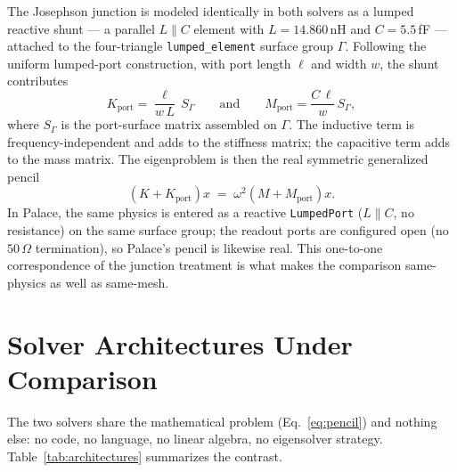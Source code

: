\documentclass{anvil-paper}
\begin{document}
The Josephson junction is modeled identically in both solvers as a lumped
reactive shunt --- a parallel $L \parallel C$ element with
$L = 14.860$\,nH and $C = 5.5$\,fF --- attached to the four-triangle
\texttt{lumped\_element} surface group $\Gamma$. Following the uniform
lumped-port construction, with port length $\ell$ and width $w$, the shunt
contributes
\begin{equation}
  K_{\mathrm{port}} = \frac{\ell}{w\,L}\, S_\Gamma
  \qquad\text{and}\qquad
  M_{\mathrm{port}} = \frac{C\,\ell}{w}\, S_\Gamma ,
  \label{eq:port}
\end{equation}
where $S_\Gamma$ is the port-surface matrix assembled on $\Gamma$. The
inductive term is frequency-independent and adds to the stiffness matrix;
the capacitive term adds to the mass matrix. The eigenproblem is then the
real symmetric generalized pencil
\begin{equation}
  \left(K + K_{\mathrm{port}}\right) x
  \;=\; \omega^2 \left(M + M_{\mathrm{port}}\right) x .
  \label{eq:pencil}
\end{equation}
In Palace, the same physics is entered as a reactive \texttt{LumpedPort}
($L \parallel C$, no resistance) on the same surface group; the readout
ports are configured open (no $50\,\Omega$ termination), so Palace's pencil
is likewise real. This one-to-one correspondence of the junction treatment
is what makes the comparison same-physics as well as same-mesh.

\section{Solver Architectures Under Comparison}
\label{sec:solvers}

The two solvers share the mathematical problem
(Eq.~\ref{eq:pencil}) and nothing else: no code, no language, no linear
algebra, no eigensolver strategy. Table~\ref{tab:architectures} summarizes
the contrast.
\end{document}
